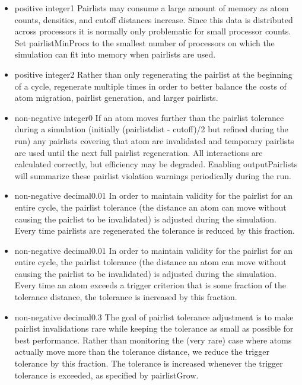 \begin{itemize}
\item
{}
{positive integer}{1}
{
Pairlists may consume a large amount of memory as atom counts, densities,
and cutoff distances increase.  Since this data is distributed across
processors it is normally only problematic for small processor counts.
Set pairlistMinProcs to the smallest number of processors on which
the simulation can fit into memory when pairlists are used.
}

\item
{}
{positive integer}{2}
{
Rather than only regenerating the pairlist at the beginning of a cycle,
regenerate multiple times in order to better balance the costs of
atom migration, pairlist generation, and larger pairlists.
}

\item
{}
{non-negative integer}{0}
{
If an atom moves further than the pairlist tolerance during a simulation
(initially (pairlistdist - cutoff)/2 but refined during the run) any
pairlists covering that atom are invalidated and temporary pairlists
are used until the next full pairlist regeneration.  All interactions
are calculated correctly, but efficiency may be degraded.  Enabling
outputPairlists will summarize these pairlist violation warnings
periodically during the run.
}

\item
{}
{non-negative decimal}{0.01}
{
In order to maintain validity for the pairlist for an entire cycle,
the pairlist tolerance (the distance an atom can move without causing
the pairlist to be invalidated) is adjusted during the simulation.
Every time pairlists are regenerated the tolerance is reduced by
this fraction.
}

\item
{}
{non-negative decimal}{0.01}
{
In order to maintain validity for the pairlist for an entire cycle,
the pairlist tolerance (the distance an atom can move without causing
the pairlist to be invalidated) is adjusted during the simulation.
Every time an atom exceeds a trigger criterion that is some fraction
of the tolerance distance, the tolerance is increased by this fraction.
}

\item
{}
{non-negative decimal}{0.3}
{
The goal of pairlist tolerance adjustment is to make pairlist invalidations
rare while keeping the tolerance as small as possible for best performance.
Rather than monitoring the (very rare) case where atoms actually move more
than the tolerance distance, we reduce the trigger tolerance by this
fraction.  The tolerance is increased whenever the trigger tolerance is
exceeded, as specified by pairlistGrow.
}

\end{itemize}
